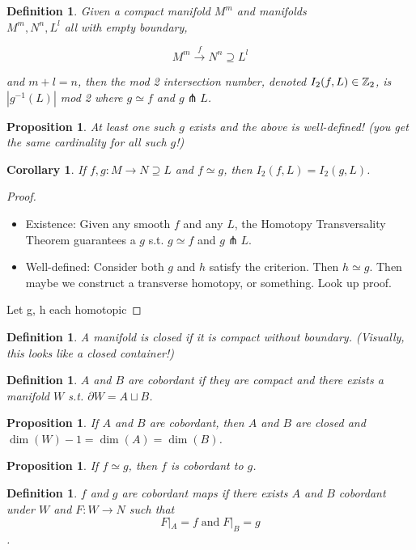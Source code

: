 \documentclass[11pt]{amsbook}
\theoremstyle{mystyle} \newtheorem{thrm}[thm]{Theorem}
\theoremstyle{mystyle} \newtheorem{defi}[thm]{Definition}
\theoremstyle{mystyle} \newtheorem{coro}[thm]{Corollary}
\theoremstyle{mystyle} \newtheorem{propo}[thm]{Proposition}
\theoremstyle{mystyle} \newtheorem{lemm}[thm]{Lemma}
\numberwithin{thm}{section}
\newcommand{\homotopic}{\simeq}
\renewcommand{\d}{\partial}
\newcommand{\transverse}{\pitchfork}
\newcommand{\de}{\emph}
\begin{document}
\begin{defi}
	Given a compact manifold $M^m$ and manifolds \\$M^m, N^n, L^l$ all with empty boundary,

	$$M^m \overset{f}{\to} N^n \supseteq L^l$$

	and $m + l = n$, then the \de{mod 2 intersection number}, denoted $I_2(f, L) \in {\mathbb Z}_2$, is $|g^{-1}(L)|$ mod 2 where $g \homotopic f$ and $g \transverse L$.
\end{defi}
\begin{propo}
	At least one such $g$ exists and the above is well-defined!  (you get the same cardinality for all such $g$!)
\end{propo}
\begin{coro}
	If $f,g: M \to N \supseteq L$ and $f \homotopic g$, then $I_2(f, L) = I_2(g, L)$.
\end{coro}
\begin{proof}
	\begin{itemize}
		\item Existence: Given any smooth $f$ and any $L$, the Homotopy Transversality Theorem guarantees a $g$ s.t. $g \homotopic f$ and $g \transverse L$.
		\item Well-defined: Consider both $g$ and $h$ satisfy the criterion.  Then $h \homotopic g$.  Then maybe we construct a transverse homotopy, or something.  Look up proof.
	\end{itemize}
		Let g, h each homotopic
\end{proof}
\begin{defi}
	A manifold is \de{closed} if it is compact without boundary.  (Visually, this looks like a closed container!)
\end{defi}
\begin{defi}
	$A$ and $B$ are \de{cobordant} if they are compact and there exists a manifold $W$ s.t. $\d W = A \sqcup B$.
\end{defi}
\begin{propo}
	If $A$ and $B$ are cobordant, then $A$ and $B$ are closed and $\dim(W)-1 = \dim(A) = \dim(B)$.
\end{propo}
\begin{propo}
	If $f \homotopic g$, then $f$ is cobordant to $g$.
\end{propo}
\begin{defi}
	$f$ and $g$ are \de{cobordant} maps if there exists $A$ and $B$ cobordant under $W$ and $F: W \to N$ such that
	$$F|_A = f \;\text{and}\; F|_B = g$$.
\end{defi}
\end{document}
